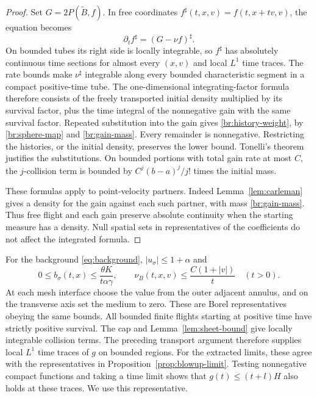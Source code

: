 \begin{proof}
Set \(G=2P(\widetilde B,f)\). In free coordinates
\(f^\sharp(t,x,v)=f(t,x+tv,v)\), the equation becomes
\[
\partial_t f^\sharp=(G-\nu f)^\sharp.
\]
On bounded tubes its right side is locally integrable, so \(f^\sharp\)
has absolutely continuous time sections for almost every \((x,v)\)
and local \(L^1\) time traces.
The rate bounds make \(\nu^\sharp\) integrable along every bounded
characteristic segment in a compact positive-time tube. The one-dimensional integrating-factor
formula therefore consists of the freely
transported initial density multiplied by its survival factor, plus the
time integral of the nonnegative gain with the same survival factor.
Repeated substitution into the gain gives \eqref{br:history-weight},
by \eqref{br:sphere-map} and \eqref{br:gain-mass}. Every remainder is
nonnegative. Restricting the histories, or the initial density, preserves
the lower bound. Tonelli's theorem justifies the substitutions. On bounded
portions with total gain rate at most \(C\), the \(j\)-collision term is
bounded by \(C^j(b-a)^j/j!\) times the initial mass.

These formulas apply to point-velocity partners. Indeed
Lemma~\ref{lem:carleman} gives a density for the gain against each such
partner, with mass \eqref{br:gain-mass}. Thus free flight and each gain
preserve absolute continuity when the starting measure has a density.
Null spatial sets in representatives of the coefficients do not affect
the integrated formula.
\end{proof}

For the background \eqref{eq:background}, \(|u_\sigma|\le1+\alpha\) and
\begin{equation}\label{br:global-rate}
0\le b_\sigma(t,x)\le\frac{\theta K}{t\alpha\gamma},
\qquad
\nu_B(t,x,v)\le\frac{C(1+|v|)}{t}\quad(t>0).
\end{equation}
At each mesh interface choose the value from the outer adjacent
annulus, and on the transverse axis set the medium to zero.
These are Borel representatives obeying the same bounds.
All bounded finite flights starting at
positive time have strictly positive survival. The cap and
Lemma~\ref{lem:sheet-bound} give locally integrable collision terms.
The preceding transport argument therefore supplies local \(L^1\)
time traces of \(g\) on bounded regions. For the extracted limits,
these agree with the representatives in
Proposition~\ref{prop:blowup-limit}. Testing
nonnegative compact functions and taking a time limit shows that
\(g(t)\le(t+l)H\) also holds at these traces. We use this representative.

